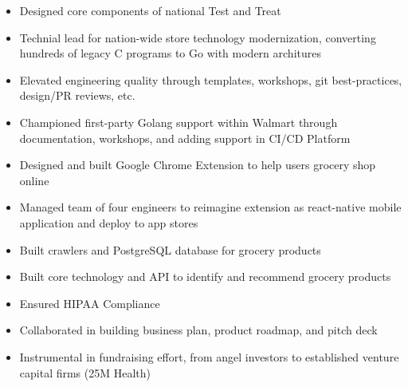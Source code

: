 \documentclass[10pt,a4paper,ragged2e,withhyper]{altacv}
\begin{document}
\begin{paracol}{2}

  \begin{itemize}
      \item Designed core components of national Test and Treat
      \item Technial lead for nation-wide store technology modernization, converting hundreds of legacy C programs to Go with modern architures
      \item Elevated engineering quality through templates, workshops, git best-practices, design/PR reviews, etc.
      \item Championed first-party Golang support within Walmart through documentation, workshops, and adding support in CI/CD Platform
  \end{itemize}
  
  \divider

  \begin{itemize}
    \item Designed and built Google Chrome Extension to help users grocery shop online
    \item Managed team of four engineers to reimagine extension as react-native mobile application and deploy to app stores
    \item Built crawlers and PostgreSQL database for grocery products
    \item Built core technology and API to identify and recommend grocery products
    \item Ensured HIPAA Compliance
    \item Collaborated in building business plan, product roadmap, and pitch deck
    \item Instrumental in fundraising effort, from angel investors to established venture capital firms (25M Health)
  \end{itemize}
  
  \divider
  

\end{paracol}
\end{document}
